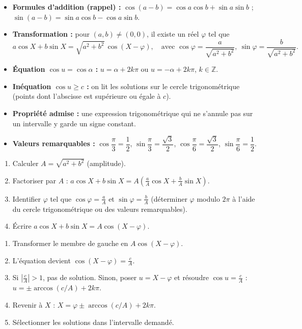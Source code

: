 \documentclass[11pt]{article}
\begin{document}
\begin{aretenir}
\begin{itemize}
\item \textbf{Formules d'addition (rappel) :} $\cos(a-b)=\cos a\cos b+\sin a\sin b$ ; $\sin(a-b)=\sin a\cos b-\cos a\sin b$.
\item \textbf{Transformation :} pour $(a,b)\neq(0,0)$, il existe un réel $\varphi$ tel que
\[ a\cos X+b\sin X=\sqrt{a^{2}+b^{2}}\,\cos(X-\varphi),\quad \text{avec } \cos\varphi=\frac{a}{\sqrt{a^{2}+b^{2}}},\ \sin\varphi=\frac{b}{\sqrt{a^{2}+b^{2}}}. \]
\item \textbf{Équation $\cos u=\cos\alpha$ :} $u=\alpha+2k\pi$ ou $u=-\alpha+2k\pi$, $k\in\mathbb{Z}$.
\item \textbf{Inéquation $\cos u\geq c$ :} on lit les solutions sur le cercle trigonométrique (points dont l'abscisse est supérieure ou égale à $c$).
\item \textbf{Propriété admise :} une expression trigonométrique qui ne s'annule pas sur un intervalle y garde un signe constant.
\item \textbf{Valeurs remarquables :} $\cos\dfrac{\pi}{3}=\dfrac{1}{2}$, $\sin\dfrac{\pi}{3}=\dfrac{\sqrt{3}}{2}$, $\cos\dfrac{\pi}{6}=\dfrac{\sqrt{3}}{2}$, $\sin\dfrac{\pi}{6}=\dfrac{1}{2}$.
\end{itemize}
\end{aretenir}

\begin{methode}
\begin{enumerate}
\item Calculer $A=\sqrt{a^{2}+b^{2}}$ (amplitude).
\item Factoriser par $A$ : $a\cos X+b\sin X = A\left(\frac{a}{A}\cos X+\frac{b}{A}\sin X\right)$.
\item Identifier $\varphi$ tel que $\cos\varphi=\frac{a}{A}$ et $\sin\varphi=\frac{b}{A}$ (déterminer $\varphi$ modulo $2\pi$ à l'aide du cercle trigonométrique ou des valeurs remarquables).
\item Écrire $a\cos X+b\sin X = A\cos(X-\varphi)$.
\end{enumerate}
\end{methode}

\begin{methode}[Résoudre $a\cos X+b\sin X = c$]
\begin{enumerate}
\item Transformer le membre de gauche en $A\cos(X-\varphi)$.
\item L'équation devient $\cos(X-\varphi) = \frac{c}{A}$.
\item Si $\left|\frac{c}{A}\right| > 1$, pas de solution. Sinon, poser $u=X-\varphi$ et résoudre $\cos u = \frac{c}{A}$ : $u = \pm\arccos(c/A) + 2k\pi$.
\item Revenir à $X$ : $X = \varphi \pm \arccos(c/A) + 2k\pi$.
\item Sélectionner les solutions dans l'intervalle demandé.
\end{enumerate}
\end{methode}
\end{document}

